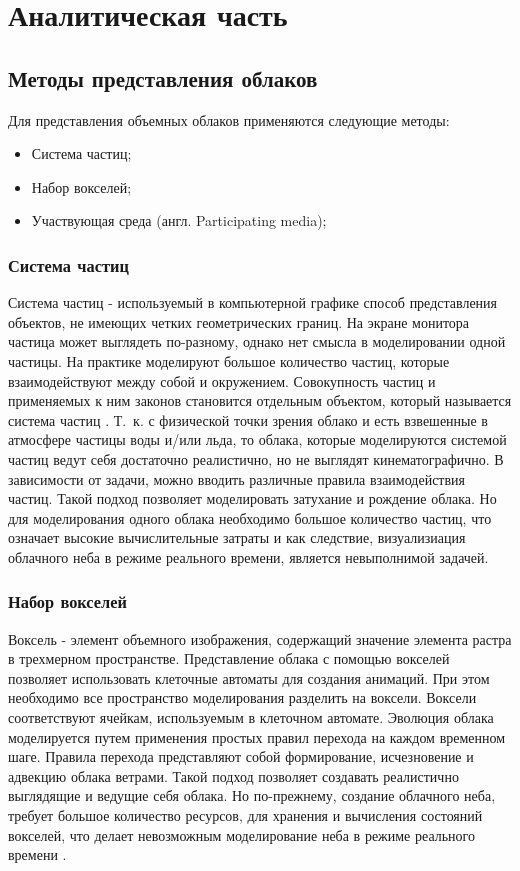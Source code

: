 \chapter{Аналитическая часть}

\section{Методы представления облаков}

Для представления объемных облаков применяются следующие методы:
\begin{itemize}
	\item Система частиц;
	\item Набор вокселей;
	\item Участвующая среда (англ. Participating media);
\end{itemize}

\subsection{Система частиц}

Система частиц - используемый в компьютерной графике способ представления объектов, не имеющих четких геометрических границ.
На экране монитора частица может выглядеть по-разному, однако нет смысла
в моделировании одной частицы. На практике моделируют большое
количество частиц, которые взаимодействуют между собой и
окружением. Совокупность частиц и применяемых к ним законов становится отдельным объектом,
который называется система частиц \cite{particles1}. Т.~к. с физической точки зрения облако и есть взвешенные в атмосфере частицы воды и/или льда, то 
облака, которые моделируются системой частиц ведут себя достаточно реалистично, но не выглядят кинематографично. В зависимости от задачи, можно вводить различные правила взаимодействия частиц.
Такой подход позволяет моделировать затухание и рождение облака. Но для моделирования одного облака необходимо большое количество частиц, что означает высокие вычислительные затраты и как следствие, визуализиация облачного неба в режиме реального времени, является невыполнимой задачей.  

\subsection{Набор вокселей} 

Воксель - элемент объемного изображения, содержащий значение элемента растра в трехмерном пространстве.
Представление облака с помощью вокселей позволяет использовать клеточные автоматы для создания анимаций. При этом необходимо все пространство моделирования разделить на воксели. Воксели
соответствуют ячейкам, используемым в клеточном автомате. Эволюция облака моделируется путем
применения простых правил перехода на каждом временном шаге. Правила
перехода представляют собой формирование, исчезновение и адвекцию облака ветрами.
Такой подход позволяет создавать реалистично выглядящие и ведущие себя облака. Но по-прежнему, создание облачного неба, требует большое количество ресурсов, для хранения и вычисления состояний вокселей, что делает невозможным моделирование неба в режиме реального времени \cite{voxel}.

